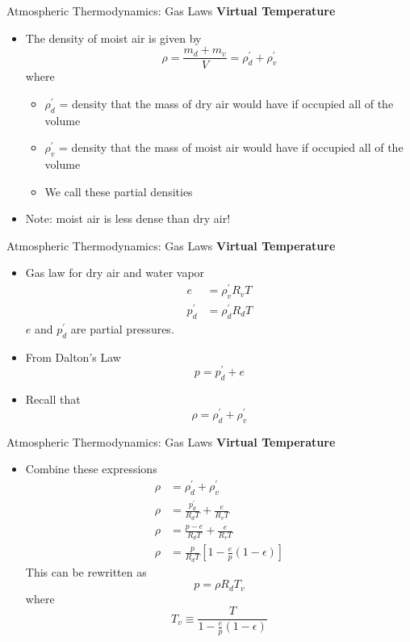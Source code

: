 \begin{frame}{Atmospheric Thermodynamics: Gas Laws}
\textbf{Virtual Temperature}
\begin{itemize}
	\item The density of moist air is given by
	$$\rho = \frac{m_d + m_v}{V} = \rho_d^\prime + \rho_v^\prime$$
	where
	\begin{itemize}
		\item $\rho_d^\prime$ = density that the mass of dry air would have if occupied all of the volume
		\item $\rho_v^\prime$ = density that the mass of moist air would have if occupied all of the volume
		\item We call these partial densities
	\end{itemize}
	\item Note: moist air is less dense than dry air!
	\end{itemize}
\end{frame}

\begin{frame}{Atmospheric Thermodynamics: Gas Laws}
\textbf{Virtual Temperature}
\begin{itemize}
	\item Gas law for dry air and water vapor
	\begin{align*}
	e &= \rho_v^\prime R_vT\\
	p_d^\prime &= \rho_d^\prime R_d T
	\end{align*}
	$e$ and $p_d^\prime$ are partial pressures.
	\item From Dalton's Law
	$$p = p_d^\prime + e$$
	\item Recall that 
	$$\rho = \rho_d^\prime + \rho_v^\prime$$
	\end{itemize}
\end{frame}

\begin{frame}{Atmospheric Thermodynamics: Gas Laws}
\textbf{Virtual Temperature}
\begin{itemize}
	\item Combine these expressions
	\begin{align*}
		\rho &= \rho_d^\prime + \rho_v^\prime\\
		\rho &= \frac{p_d^\prime}{R_dT} + \frac{e}{R_vT}\\
		\rho &= \frac{p-e}{R_dT} + \frac{e}{R_vT}\\
		\rho &= \frac{p}{R_dT}\left[1 - \frac{e}{p}(1-\epsilon)\right]
	\end{align*}
	This can be rewritten as
	$$p = \rho R_dT_v$$
	where
	$$T_v \equiv \frac{T}{1 - \frac{e}{p}(1-\epsilon)}$$
\end{itemize}
\end{frame}

